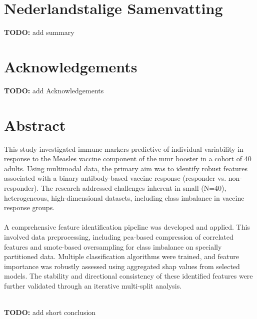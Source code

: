 \documentclass[12pt,a4paper]{report}
\newcommand{\todo}[1]{%
  \par\noindent%
  \begin{tcolorbox}[colback=yellow, colframe=black, boxrule=0.5pt, sharp corners, width=\linewidth, before skip=5pt, after skip=5pt]
    \textbf{TODO:} #1
  \end{tcolorbox}%
  \par
}
\begin{document}
{}
\chapter*{Nederlandstalige Samenvatting}
\todo{add summary}

{}
\chapter*{Acknowledgements}
\todo{add Acknowledgements}

{}
\chapter*{Abstract}
This study investigated immune markers predictive of individual variability in response to the Measles vaccine component of the \gls{mmr} booster in a cohort of 40 adults. Using multimodal data, the primary aim was to identify robust features associated with a binary antibody-based vaccine response (responder vs. non-responder). The research addressed challenges inherent in small (N=40), heterogeneous, high-dimensional datasets, including class imbalance in vaccine response groups.\\
\\
A comprehensive feature identification pipeline was developed and applied. This involved data preprocessing, including \acrshort{pca}-based compression of correlated features and \acrshort{smote}-based oversampling for class imbalance on specially partitioned data. Multiple classification algorithms were trained, and feature importance was robustly assessed using aggregated \gls{shap} values from selected models. The stability and directional consistency of these identified features were further validated through an iterative multi-split analysis.\\
\\
\todo{add short conclusion}
\end{document}
